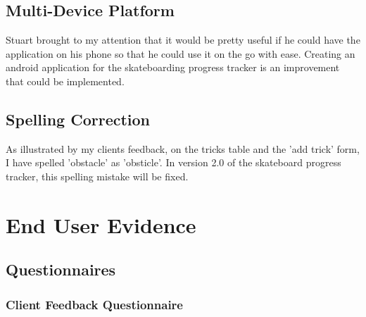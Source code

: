 	\subsection{Multi-Device Platform}

Stuart brought to my attention that it would be pretty useful if he could have the application on his phone so that he could use it on the go with ease. Creating an android application for the skateboarding progress tracker is an improvement that could be implemented.

	\subsection{Spelling Correction}

As illustrated by my clients feedback, on the tricks table and the 'add trick' form, I have spelled 'obstacle' as 'obsticle'. In version 2.0 of the skateboard progress tracker, this spelling mistake will be fixed.



\section{End User Evidence}

\subsection{Questionnaires} \label{QSub}

\subsubsection{Client Feedback Questionnaire} 


